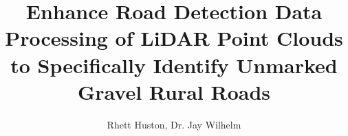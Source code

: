 \documentclass[journal,onecolumn]{IEEEtran}
\begin{document}
	\title{Enhance Road Detection Data Processing of LiDAR Point Clouds to Specifically Identify Unmarked Gravel Rural Roads}
	
	\author{Rhett Huston, Dr. Jay Wilhelm}
	
\end{document}
